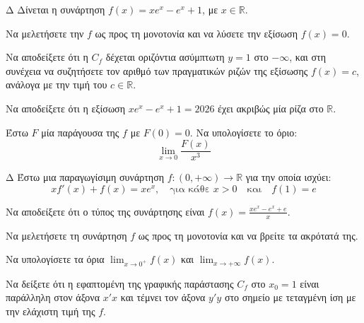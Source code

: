 \begin{thema}{Δ}
Δίνεται η συνάρτηση $f(x) = x e^x - e^x + 1$, με $x \in \mathbb{R}$.
\begin{erwthma}
    \item Να μελετήσετε την $f$ ως προς τη μονοτονία και να λύσετε την εξίσωση $f(x) = 0$.
    \item Να αποδείξετε ότι η $C_f$ δέχεται οριζόντια ασύμπτωτη $y = 1$ στο $-\infty$, και στη συνέχεια να συζητήσετε τον αριθμό των πραγματικών ριζών της εξίσωσης $f(x) = c$, ανάλογα με την τιμή του $c \in \mathbb{R}$.
    \item Να αποδείξετε ότι η εξίσωση $x e^x - e^x + 1 = 2026$ έχει ακριβώς μία ρίζα στο $\mathbb{R}$.
    \item Έστω $F$ μία παράγουσα της $f$ με $F(0) = 0$. Να υπολογίσετε το όριο:
    \[ \lim_{x \to 0} \frac{F(x)}{x^3} \]
\end{erwthma}
\end{thema}

\begin{thema}{Δ}
Έστω μια παραγωγίσιμη συνάρτηση $f: (0, +\infty) \to \mathbb{R}$ για την οποία ισχύει:
\[ x f'(x) + f(x) = x e^x, \quad \text{για κάθε } x > 0 \quad \text{και} \quad f(1) = e \]
\begin{erwthma}
    \item Να αποδείξετε ότι ο τύπος της συνάρτησης είναι $f(x) = \frac{x e^x - e^x + e}{x}$.
    \item Να μελετήσετε τη συνάρτηση $f$ ως προς τη μονοτονία και να βρείτε τα ακρότατά της.
    \item Να υπολογίσετε τα όρια $\displaystyle\lim_{x\to 0^+} f(x)$ και $\displaystyle\lim_{x\to +\infty} f(x)$.
    \item Να δείξετε ότι η εφαπτομένη της γραφικής παράστασης $C_f$ στο $x_0 = 1$ είναι παράλληλη στον άξονα $x'x$ και τέμνει τον άξονα $y'y$ στο σημείο με τεταγμένη ίση με την ελάχιστη τιμή της $f$.
\end{erwthma}
\end{thema}


